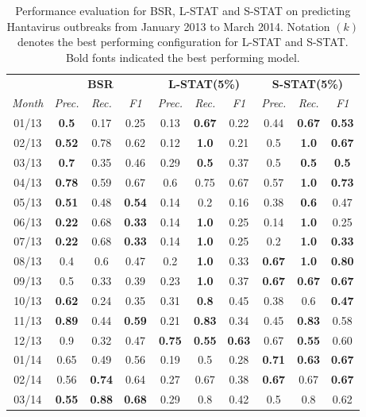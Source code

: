 \documentclass[conference]{IEEEtran}
\newcommand{\fullmodel}{{S-STAT}\xspace}
\newcommand{\locationmodel}{{L-STAT}\xspace}
\begin{document}
\begin{table}[h]
\scriptsize \centering
  \caption{Performance evaluation for BSR, \locationmodel and \fullmodel on predicting Hantavirus outbreaks from January 2013 to March 2014. Notation $(k)$ denotes the best performing configuration for \locationmodel and \fullmodel. Bold fonts indicated the best performing model.}
  \begin{tabular}{|c|c|c|c|c|c|c|c|c|c|}
    \hline
    & \multicolumn{3}{c|}{{\bf BSR}} &
    \multicolumn{3}{c|}{{\bf \locationmodel(5\%)}} &
    \multicolumn{3}{c|}{{\bf \fullmodel(5\%)}} \\
    \cline{2-10} {\em Month}   & {\em Prec.} & {\em Rec.} & {\em F1} & {\em Prec.} & {\em Rec.} & {\em F1} & {\em Prec.} & {\em Rec.} & {\em F1} \\
    \hline 
    01/13 & {\bf 0.5} & 0.17 & 0.25 & 0.13 & {\bf 0.67} & 0.22 & 0.44 & {\bf 0.67} & {\bf 0.53}\\ 
    \hline
     02/13 & {\bf 0.52} & 0.78 & 0.62 & 0.12 & {\bf 1.0} & 0.21 & 0.5 & {\bf 1.0} & {\bf 0.67}\\ 
    \hline
    03/13 & {\bf 0.7} & 0.35 & 0.46 & 0.29 & {\bf 0.5} & 0.37 & 0.5 & {\bf 0.5} & {\bf 0.5}\\ 
    \hline
    04/13 & {\bf 0.78} & 0.59 & 0.67 & 0.6 & 0.75 & 0.67 & 0.57 & {\bf 1.0} & {\bf 0.73}\\ 
    \hline
    05/13 & {\bf 0.51} & 0.48 & {\bf 0.54} & 0.14 & 0.2 & 0.16 & 0.38 & {\bf 0.6} & 0.47\\ 
    \hline
    06/13 & {\bf 0.22} & 0.68 & {\bf 0.33} & 0.14 & {\bf 1.0} & 0.25 & 0.14 & {\bf 1.0} & 0.25\\ 
    \hline
    07/13 & {\bf 0.22} & 0.68 & {\bf 0.33} & 0.14 & {\bf 1.0} & 0.25 & 0.2 & {\bf 1.0} & {\bf 0.33}\\ 
    \hline
    08/13 & 0.4 & 0.6 & 0.47 & 0.2 & {\bf 1.0} & 0.33 & {\bf 0.67} & {\bf 1.0} & {\bf 0.80}\\ 
    \hline
    09/13 & 0.5 & 0.33 & 0.39 & 0.23 & {\bf 1.0} & 0.37 & {\bf 0.67} & {\bf 0.67} & {\bf 0.67}\\ 
    \hline
    10/13 & {\bf 0.62} & 0.24 & 0.35 & 0.31 & {\bf 0.8} & 0.45 & 0.38 & 0.6 & {\bf 0.47}\\ 
    \hline
    11/13 & {\bf 0.89} & 0.44 & {\bf 0.59} & 0.21 & {\bf 0.83} & 0.34 & 0.45 & {\bf 0.83} & 0.58\\ 
    \hline
    12/13 & 0.9 & 0.32 & 0.47 & {\bf 0.75} & {\bf 0.55} & {\bf 0.63} & 0.67 & {\bf 0.55} & 0.60\\ 
    \hline
    01/14 & 0.65 & 0.49 & 0.56 & 0.19 & 0.5 & 0.28 &  {\bf 0.71}& {\bf 0.63} & {\bf 0.67}\\ 
    \hline
    02/14 & 0.56 & {\bf 0.74} & 0.64 & 0.27 &  0.67 & 0.38 & {\bf 0.67} & 0.67 & {\bf 0.67}\\ 
    \hline
    03/14 & {\bf 0.55} & {\bf 0.88} & {\bf 0.68} & 0.29 & 0.8 & 0.42 & 0.5 & 0.8 & 0.62 \\ 
    \hline

  \end{tabular}
  \label{tab:results}
\end{table}
\end{document}
